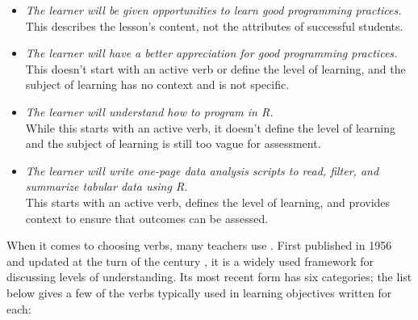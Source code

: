 \begin{itemize}

\item
  \emph{The learner will be given opportunities to learn good programming practices.}\\
  This describes the lesson's content,
  not the attributes of successful students.\\

\item
  \emph{The learner will have a better appreciation for good programming practices.}\\
  This doesn't start with an active verb or define the level of learning,
  and the subject of learning has no context and is not specific.\\

\item
  \emph{The learner will understand how to program in R.}\\
  While this starts with an active verb,
  it doesn't define the level of learning
  and the subject of learning is still too vague for assessment.\\

\item
  \emph{The learner will write one-page data analysis scripts to read, filter, and summarize tabular data using R.}\\
  This starts with an active verb,
  defines the level of learning,
  and provides context to ensure that outcomes can be assessed.

\end{itemize}

When it comes to choosing verbs,
many teachers use .
First published in 1956 and updated at the turn of the century \cite{Ande2001},
it is a widely used framework for discussing levels of understanding.
Its most recent form has six categories;
the list below gives a few of the verbs typically used in learning objectives written for each:

